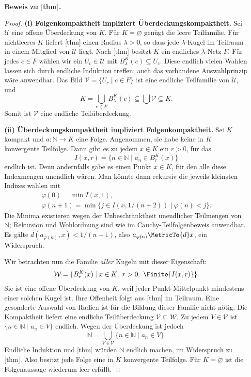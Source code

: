 \noindent\textbf{Beweis zu [thm].}
\begin{proof}
\noindent\textbf{(i) Folgenkompaktheit impliziert Überdeckungskompaktheit.}
Sei \(\mathcal U\) eine offene Überdeckung von \(K\). Für
\(K=\varnothing\) genügt die leere Teilfamilie.
Für nichtleeres \(K\) liefert
[thm]
einen Radius \(\lambda>0\), so dass jede \(\lambda\)-Kugel im Teilraum
in einem Mitglied von \(\mathcal U\) liegt. Nach
[thm]
besitzt \(K\) ein endliches \(\lambda\)-Netz \(F\).
Für jedes \(c\in F\) wählen wir ein \(U_c\in\mathcal U\) mit
\(B_\lambda^K(c)\subseteq U_c\). Diese endlich vielen Wahlen lassen
sich durch endliche Induktion treffen; auch das vorhandene Auswahlprinzip
wäre anwendbar. Das Bild \(\mathcal V=\{U_c\mid c\in F\}\) ist eine
endliche Teilfamilie von \(\mathcal U\), und
\[
 K=\bigcup_{c\in F}B_\lambda^K(c)
   \subseteq\bigcup\mathcal V\subseteq K.
\]
Somit ist \(\mathcal V\) eine endliche Teilüberdeckung.

\medskip\noindent\textbf{(ii) Überdeckungskompaktheit impliziert
Folgenkompaktheit.}
Sei \(K\) kompakt und \(a\colon\mathbb N\to K\) eine Folge.
Angenommen, sie habe keine in \(K\) konvergente Teilfolge.
Dann gibt es zu jedem \(x\in K\) ein \(r>0\), für das
\[
 I(x,r)=\{n\in\mathbb N\mid a_n\in B_r^K(x)\}
\]
endlich ist. Denn andernfalls gäbe es einen Punkt \(x\in K\), für den
alle diese Indexmengen unendlich wären. Man könnte dann rekursiv die
jeweils kleinsten Indizes wählen mit
\[
 \begin{gathered}
 \varphi(0)=\min I(x,1),\\
 \varphi(n+1)=\min\{j\in I(x,1/(n+2))\mid\varphi(n)<j\}.
 \end{gathered}
\]
Die Minima existieren wegen der Unbeschränktheit unendlicher Teilmengen
von \(\mathbb N\); Rekursion und Wohlordnung sind wie im
Cauchy-Teilfolgenbeweis anwendbar. Es gälte
\(d(a_{\varphi(n)},x)<1/(n+1)\), also
\(a_{\varphi(n)}\MetricTo{d}x\), ein Widerspruch.

Wir betrachten nun die Familie \emph{aller} Kugeln mit dieser Eigenschaft:
\[
 \mathcal W=\{B_r^K(x)\mid x\in K,\ r>0,\ \Finite{I(x,r)}\}.
\]
Sie ist eine offene Überdeckung von \(K\), weil jeder Punkt Mittelpunkt
mindestens einer solchen Kugel ist. Ihre Offenheit folgt aus
[thm] im Teilraum.
Eine gesonderte Auswahl von Radien ist für die Bildung dieser Familie
nicht nötig. Die Kompaktheit liefert eine endliche Teilüberdeckung
\(\mathcal V\subseteq\mathcal W\). Zu jedem \(V\in\mathcal V\)
ist \(\{n\in\mathbb N\mid a_n\in V\}\) endlich. Wegen der Überdeckung
ist jedoch
\[
 \mathbb N=\bigcup_{V\in\mathcal V}\{n\in\mathbb N\mid a_n\in V\}.
\]
Endliche Induktion und [thm] würden
\(\mathbb N\) endlich machen, im Widerspruch zu
[thm]. Also besitzt jede Folge
eine in \(K\) konvergente Teilfolge. Für \(K=\varnothing\) ist die
Folgenaussage wiederum leer erfüllt.


\end{proof}
